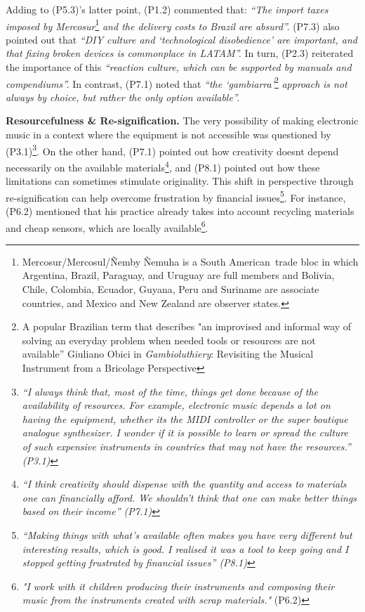 \documentclass[sigconf]{nimeart}
\begin{document}
Adding to (P5.3)'s latter point, (P1.2) commented that: \emph{``The import taxes imposed by Mercosur}\footnote{Mercosur/Mercosul/Ñemby Ñemuha is a South American~trade bloc in which Argentina, Brazil, Paraguay, and Uruguay are full members and Bolivia, Chile, Colombia, Ecuador, Guyana, Peru and Suriname are associate countries, and Mexico and New Zealand are observer states.} \textbf{\emph{}} \emph{and the delivery costs to Brazil are absurd''.} (P7.3) also pointed out that \emph{``DIY culture and `technological disobedience' are important, and that fixing broken devices is commonplace in LATAM''.} In turn, (P2.3) reiterated the importance of this \emph{``reaction culture, which can be supported by manuals and compendiums''.} In contrast, (P7.1) \emph{} noted that \emph{``the `gambiarra'}\footnote{A popular Brazilian term that describes "an improvised and informal way of solving an everyday problem when needed tools or resources are not available'' Giuliano Obici in \emph{Gambioluthiery}: Revisiting the Musical Instrument from a Bricolage Perspective} \emph{approach} \cite{NIME21_75} \textbf{} \cite{obici2017gambioluthiery} \textbf{} \emph{is not always by choice, but rather the only option available''.}

\textbf{Resourcefulness \& Re-signification.} The very possibility of making electronic music in a context where the equipment is not accessible was questioned by (P3.1)\footnote{\emph{``I always think that, most of the time, things get done because of the availability of resources. For example, electronic music depends a lot on having the equipment, whether it\textquotesingle s the MIDI controller or the super boutique analogue synthesizer. I wonder if it is possible to learn or spread the culture of such expensive instruments in countries that may not have the resources.'' (P3.1)}}. On the other hand, (P7.1) pointed out how creativity doesn\textquotesingle t depend necessarily on the available materials\footnote{\emph{``I think creativity should dispense with the quantity and access to materials one can financially afford. We shouldn't think that one can make better things based on their income'' (P7.1)}}, and (P8.1) pointed out how these limitations can sometimes stimulate originality. This shift in perspective through re-signification can help overcome frustration by financial issues\footnote{\emph{``Making things with what's available often makes you have very different but interesting results, which is good. I realised it was a tool to keep going and I stopped getting frustrated by financial issues'' (P8.1)}}. For instance, (P6.2) mentioned that his practice already takes into account recycling materials and cheap sensors, which are locally available\footnote{\emph{"I work with it children producing their instruments and composing their music from the instruments created with scrap materials."} (P6.2)}.
\end{document}
